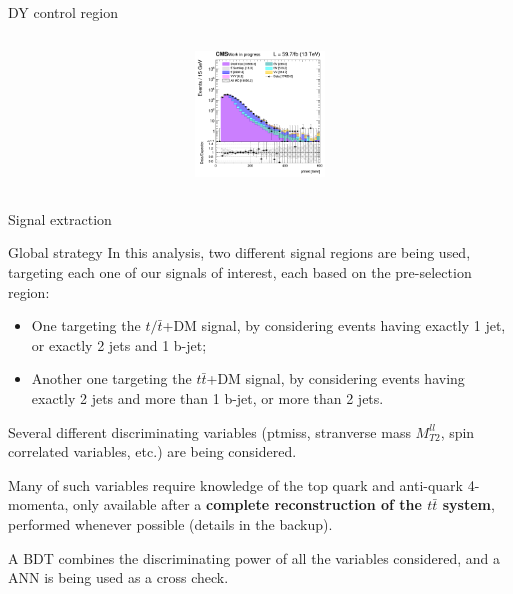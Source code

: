 \documentclass[8pt]{beamer}
\begin{document}
\begin{frame}{DY control region}
\begin{columns}
\begin{column}{0.33\textwidth}
\begin{center}
     			\includegraphics[width=1.0\textwidth, height=95pt]{figs/2018/log_cratio_dyCR_ll_METcorrected_pt.png}
    		\end{center}		
		\end{column}
\end{columns} \vfill

\end{frame}












\begin{frame}[standout]
Signal extraction
\end{frame}

\begin{frame}{Global strategy}
\justifying
In this analysis, \alert{two different signal regions} are being used, targeting each one of our signals of interest, each based on the pre-selection region:
\begin{itemize}
\item One targeting the $t/\bar t$+DM signal, by considering events having exactly 1 jet, or exactly 2 jets and 1 b-jet;
\item Another one targeting the $t \bar t$+DM signal, by considering events having exactly 2 jets and more than 1 b-jet, or more than 2 jets.
\end{itemize} \vfill

Several different \alert{discriminating variables} (ptmiss, stranverse mass $M_{T2}^{ll}$, spin correlated variables, etc.) are being considered. \vfill

Many of such variables require knowledge of the top quark and anti-quark 4-momenta, only available after a \textbf{complete reconstruction of the $t \bar t$ system}, performed whenever possible (details in the backup). \vfill

A BDT combines the discriminating power of all the variables considered, and a ANN is being used as a cross check. \vfill
\end{frame}
\end{document}
